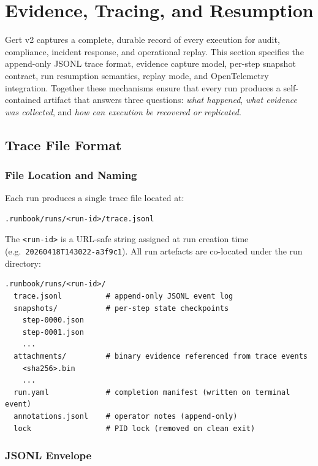 \chapter{Evidence, Tracing, and Resumption}

Gert v2 captures a complete, durable record of every execution for audit, compliance, incident response, and operational replay. This section specifies the append-only JSONL trace format, evidence capture model, per-step snapshot contract, run resumption semantics, replay mode, and OpenTelemetry integration. Together these mechanisms ensure that every run produces a self-contained artifact that answers three questions: \textit{what happened}, \textit{what evidence was collected}, and \textit{how can execution be recovered or replicated}.

\section{Trace File Format}

\subsection{File Location and Naming}

Each run produces a single trace file located at:

\begin{verbatim}
.runbook/runs/<run-id>/trace.jsonl
\end{verbatim}

The \texttt{<run-id>} is a URL-safe string assigned at run creation time (e.g.\ \texttt{20260418T143022-a3f9c1}). All run artefacts are co-located under the run directory:

\begin{verbatim}
.runbook/runs/<run-id>/
  trace.jsonl          # append-only JSONL event log
  snapshots/           # per-step state checkpoints
    step-0000.json
    step-0001.json
    ...
  attachments/         # binary evidence referenced from trace events
    <sha256>.bin
    ...
  run.yaml             # completion manifest (written on terminal event)
  annotations.jsonl    # operator notes (append-only)
  lock                 # PID lock (removed on clean exit)
\end{verbatim}

\subsection{JSONL Envelope}

